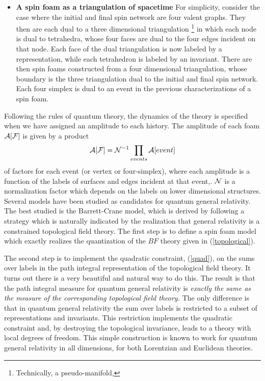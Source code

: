 \documentclass[12pt]{article}
\newcommand{\f}{\begin{equation}}
\newcommand{\ff}{\end{equation}}
\begin{document}
\begin{itemize}
\item{}{\bf A spin foam as a triangulation of spacetime}  For simplicity, consider the
case where the initial and final spin network are four valent graphs. They then are
each dual to a three dimensional 
triangulation \footnote{Technically, a pseudo-manifold,} in which each node is dual to 
tetrahedra, whose four faces are dual to the four edges incident on that node\cite{mike-foam,BC}.
Each face of the dual triangulation is now labeled by a representation, while each
tetrahedron is labeled by an invariant.  
There are then spin foams constructed from a four dimensional triangulation,
whose boundary is the three triangulation dual to the initial and final spin network.
Each four simplex is dual to an event in the previous characterizations of a 
spin foam.  

\end{itemize}

Following the rules of quantum theory, the dynamics of the theory is specified
when we have assigned an amplitude to each history.  
The amplitude of each foam ${\cal A}[{\cal F}]$ is given by a product
\f
{\cal A}[{\cal F}]= {\cal N}^{-1} \prod_{events} {\cal A}[event ]
\ff
of factors for each event (or vertex or four-simplex), where each amplitude is
a function of the labels of surfaces and edges incident at that event,.  
$\cal N$ is a normalization factor which   depends on the labels
on lower dimensional structures.   Several models have been 
studied as candidates for quantum general relativity. The best studied
is the Barrett-Crane model, which is derived by following a strategy which
is naturally indicated by the realization that general relativity is a constrained
topological field theory. The first step is to define a spin foam model which exactly realizes
the quantization of the $BF$ theory given in (\ref{topological}).  

The second step is to implement 
the quadratic constraint, (\ref{quad}),  on the sums over labels in the path integral representation
of the topological field theory. It turns out there is a very beautiful and natural
way to do this. The result is that the path integral measure for quantum general
relativity is {\it exactly the same as the measure of the corresponding topological field theory.}
The only difference is that in quantum general relativity the sum over labels is restricted to 
a subset of representations and invariants. This restriction implements the quadratic
constraint and, by destroying the topological invariance, leads to a theory with local
degrees of freedom. 
This simple construction is known to work
for quantum general relativity in all dimensions, 
for both Lorentzian and Euclidean theories\cite{higher}.
\end{document}
